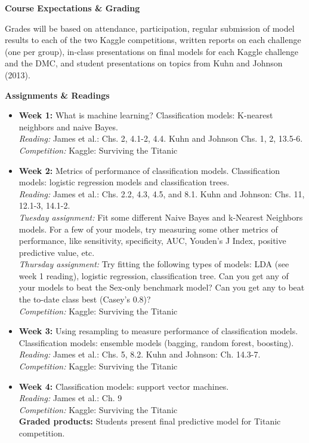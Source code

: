 \documentclass[11pt,oneside]{amsart}
\newcommand{\header}[1]{\bigbreak\textbf{#1}}
\begin{document}
\header{Course Expectations \& Grading}

Grades will be based on attendance, participation, regular submission
of model results to each of the two Kaggle competitions, written reports on
each challenge (one per group), in-class presentations on final
models for each Kaggle challenge and the DMC, and student presentations on topics from
Kuhn and Johnson (2013).

\header{Assignments \& Readings}

\begin{itemize}
\item \textbf{Week 1:} What is machine learning? Classification models: K-nearest neighbors
  and naive Bayes.\\
\emph{Reading:} James et al.: Chs. 2, 4.1-2, 4.4. Kuhn and Johnson
Chs. 1, 2, 13.5-6.\\
\emph{Competition:} Kaggle: Surviving the Titanic

\item \textbf{Week 2:} Metrics of performance of classification
  models. Classification models: logistic regression models and
  classification trees.\\
\emph{Reading:} James et al.: Chs. 2.2, 4.3, 4.5, and 8.1. Kuhn and
Johnson: Chs. 11, 12.1-3, 14.1-2.\\
\emph{Tuesday assignment:} Fit some different Naive Bayes and k-Nearest Neighbors models. For a few of your models, try measuring some other metrics of performance, like sensitivity, specificity, AUC, Youden's J Index, positive predictive value, etc.\\ 
\emph{Thursday assignment:} Try fitting the following types of models: LDA (see week 1 reading), logistic regression, classification tree. Can you get any of your models to beat the Sex-only benchmark model? Can you get any to beat the to-date class best (Casey's 0.8)?\\
\emph{Competition:} Kaggle: Surviving the Titanic

\item \textbf{Week 3:} Using resampling to measure performance of
  classification models. Classification models: ensemble models
  (bagging, random forest, boosting).\\
\emph{Reading:} James et al.: Chs. 5, 8.2. Kuhn and Johnson: Ch. 14.3-7.\\
\emph{Competition:} Kaggle: Surviving the Titanic

\item \textbf{Week 4:} Classification models: support vector
  machines.\\
\emph{Reading:} James et al.: Ch. 9\\
\emph{Competition:} Kaggle: Surviving the Titanic\\
\textbf{Graded products:} Students present final predictive model for Titanic
competition.


\end{itemize}
\end{document}
